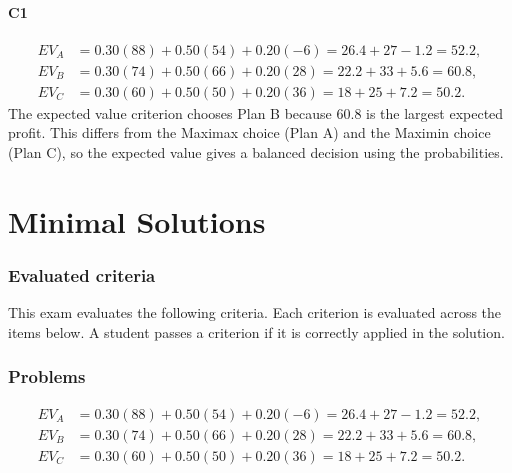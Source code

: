 \begin{ExamProblems}
		\subsection*{C1}
		\[
		\begin{aligned}
		EV_A &= 0.30(88)+0.50(54)+0.20(-6)=26.4+27-1.2=52.2,\\
		EV_B &= 0.30(74)+0.50(66)+0.20(28)=22.2+33+5.6=60.8,\\
		EV_C &= 0.30(60)+0.50(50)+0.20(36)=18+25+7.2=50.2.
		\end{aligned}
		\]
		The expected value criterion chooses Plan B because $60.8$ is the largest expected profit. This differs from the Maximax choice (Plan A) and the Maximin choice (Plan C), so the expected value gives a balanced decision using the probabilities.
	\end{ExamProblems}


\part{Minimal Solutions}

\section*{Evaluated criteria}
This exam evaluates the following criteria. Each criterion is evaluated across the items below. A student passes a criterion if it is correctly applied in the solution.

\section*{Problems}
\[\begin{aligned}
		EV_A &= 0.30(88)+0.50(54)+0.20(-6)=26.4+27-1.2=52.2,\\
		EV_B &= 0.30(74)+0.50(66)+0.20(28)=22.2+33+5.6=60.8,\\
		EV_C &= 0.30(60)+0.50(50)+0.20(36)=18+25+7.2=50.2.
		\end{aligned}\]


